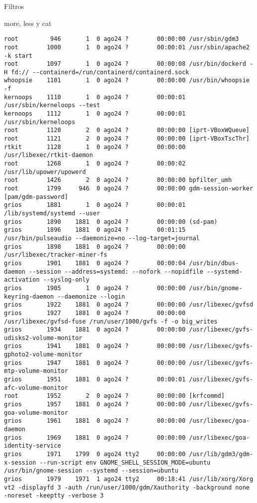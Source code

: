 \begin{section}{Filtros}
\begin{subsection}{more, less y cat}
\begin{lstlisting}[style=Ubuntu]
root         946       1  0 ago24 ?        00:00:00 /usr/sbin/gdm3
root        1000       1  0 ago24 ?        00:00:01 /usr/sbin/apache2 -k start
root        1097       1  0 ago24 ?        00:00:08 /usr/bin/dockerd -H fd:// --containerd=/run/containerd/containerd.sock
whoopsie    1101       1  0 ago24 ?        00:00:00 /usr/bin/whoopsie -f
kernoops    1110       1  0 ago24 ?        00:00:01 /usr/sbin/kerneloops --test
kernoops    1112       1  0 ago24 ?        00:00:01 /usr/sbin/kerneloops
root        1120       2  0 ago24 ?        00:00:00 [iprt-VBoxWQueue]
root        1121       2  0 ago24 ?        00:00:00 [iprt-VBoxTscThr]
rtkit       1128       1  0 ago24 ?        00:00:00 /usr/libexec/rtkit-daemon
root        1268       1  0 ago24 ?        00:00:02 /usr/lib/upower/upowerd
root        1426       2  0 ago24 ?        00:00:00 bpfilter_umh
root        1799     946  0 ago24 ?        00:00:00 gdm-session-worker [pam/gdm-password]
grios       1881       1  0 ago24 ?        00:00:01 /lib/systemd/systemd --user
grios       1890    1881  0 ago24 ?        00:00:00 (sd-pam)
grios       1896    1881  0 ago24 ?        00:01:15 /usr/bin/pulseaudio --daemonize=no --log-target=journal
grios       1898    1881  0 ago24 ?        00:00:00 /usr/libexec/tracker-miner-fs
grios       1901    1881  0 ago24 ?        00:00:04 /usr/bin/dbus-daemon --session --address=systemd: --nofork --nopidfile --systemd-activation --syslog-only
grios       1905       1  0 ago24 ?        00:00:00 /usr/bin/gnome-keyring-daemon --daemonize --login
grios       1922    1881  0 ago24 ?        00:00:00 /usr/libexec/gvfsd
grios       1927    1881  0 ago24 ?        00:00:00 /usr/libexec/gvfsd-fuse /run/user/1000/gvfs -f -o big_writes
grios       1934    1881  0 ago24 ?        00:00:00 /usr/libexec/gvfs-udisks2-volume-monitor
grios       1941    1881  0 ago24 ?        00:00:00 /usr/libexec/gvfs-gphoto2-volume-monitor
grios       1947    1881  0 ago24 ?        00:00:00 /usr/libexec/gvfs-mtp-volume-monitor
grios       1951    1881  0 ago24 ?        00:00:01 /usr/libexec/gvfs-afc-volume-monitor
root        1952       2  0 ago24 ?        00:00:00 [krfcommd]
grios       1957    1881  0 ago24 ?        00:00:00 /usr/libexec/gvfs-goa-volume-monitor
grios       1961    1881  0 ago24 ?        00:00:00 /usr/libexec/goa-daemon
grios       1969    1881  0 ago24 ?        00:00:00 /usr/libexec/goa-identity-service
grios       1971    1799  0 ago24 tty2     00:00:00 /usr/lib/gdm3/gdm-x-session --run-script env GNOME_SHELL_SESSION_MODE=ubuntu /usr/bin/gnome-session --systemd --session=ubuntu
grios       1979    1971  1 ago24 tty2     00:18:41 /usr/lib/xorg/Xorg vt2 -displayfd 3 -auth /run/user/1000/gdm/Xauthority -background none -noreset -keeptty -verbose 3

\end{lstlisting}
\end{subsection}
\end{section}
